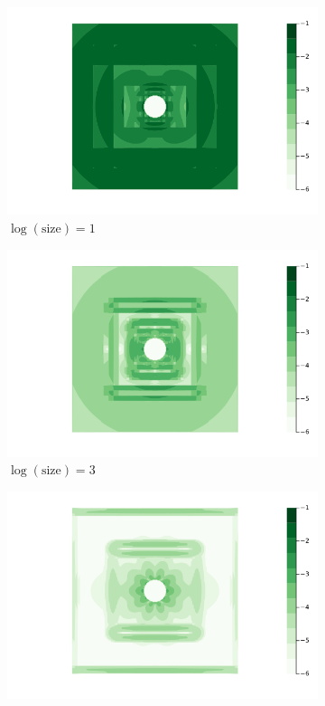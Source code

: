 \documentclass[preprint,12pt]{elsarticle}
\begin{document}
\begin{figure}
\begin{subfigure}{.5\textwidth}
  \centering
  \includegraphics[width=\linewidth]{tex/fig/lamb_dipole_error_dist2.png}
  \caption{$\log(\text{size})=1$}
\end{subfigure}%
\begin{subfigure}{.5\textwidth}
  \centering
  \includegraphics[width=\linewidth]{tex/fig/lamb_dipole_error_dist8.png}
  \caption{$\log(\text{size})=3$}
\end{subfigure}
\begin{subfigure}{.5\textwidth}
  \centering
  \includegraphics[width=\linewidth]{tex/fig/lamb_dipole_error_dist32.png}

\end{subfigure}
\end{figure}
\end{document}
